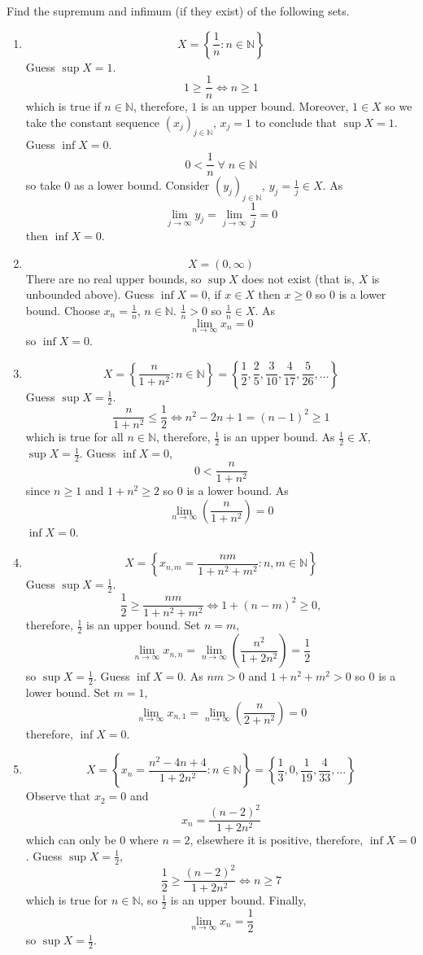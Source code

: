 \begin{example}
    Find the supremum and infimum (if they exist) of the following sets.
    \begin{enumerate}
        \item \[X=\left\{\frac1n:n\in\mathbb N\right\}\]
        Guess $\sup{X}=1$. \[1\geq\frac1n\iff n\geq1\] which is true if $n\in\mathbb N$, therefore, $1$ is an upper bound. Moreover, $1\in X$ so we take the constant sequence $(x_j)_{j\in\mathbb N}$, $x_j=1$ to conclude that $\sup{X}=1$. Guess $\inf{X}=0$. \[0<\frac1n\;\forall\;n\in\mathbb N\] so take $0$ as a lower bound. Consider $(y_j)_{j\in\mathbb N}$, $y_j=\frac1j\in X$. As \[\lim_{j\to\infty}y_j=\lim_{j\to\infty}\frac1j=0\] then $\inf{X}=0$.
        
        \item \[X=(0,\infty)\]
        There are no real upper bounds, so $\sup{X}$ does not exist (that is, $X$ is unbounded above). Guess $\inf{X}=0$, if $x\in X$ then $x\geq 0$ so $0$ is a lower bound. Choose $x_n=\frac1n$, $n\in\mathbb N$. $\frac1n>0$ so $\frac1n\in X$. As \[\lim_{n\to\infty}x_n=0\] so $\inf{X}=0$.
        
        \item \[X=\left\{\dfrac{n}{1+n^2}:n\in\mathbb N\right\}=\left\{\frac12,\frac25,\frac3{10},\frac4{17},\frac5{26},\ldots\right\}\]
        Guess $\sup{X}=\frac12$. \[\dfrac{n}{1+n^2}\leq\frac12\iff n^2-2n+1=(n-1)^2\geq 1\] which is true for all $n\in\mathbb N$, therefore, $\frac12$ is an upper bound. As $\frac12\in X$, $\sup{X}=\frac12$. Guess $\inf{X}=0$, \[0<\dfrac{n}{1+n^2}\] since $n\geq 1$ and $1+n^2\geq2$ so $0$ is a lower bound. As \[\lim_{n\to\infty}\left(\dfrac{n}{1+n^2}\right)=0\] $\inf{X}=0$.
        
        \item \[X=\left\{x_{n,m}=\dfrac{nm}{1+n^2+m^2}:n,m\in\mathbb N\right\}\]
        Guess $\sup{X}=\frac12$. \[\frac12\geq\dfrac{nm}{1+n^2+m^2}\iff1+(n-m)^2\geq 0,\] therefore, $\frac12$ is an upper bound. Set $n=m$, \[\lim_{n\to\infty}x_{n,n}=\lim_{n\to\infty}\left(\dfrac{n^2}{1+2n^2}\right)=\frac12\] so $\sup{X}=\frac12$. Guess $\inf{X}=0$. As $nm>0$ and $1+n^2+m^2>0$ so $0$ is a lower bound. Set $m=1$, \[\lim_{n\to\infty}x_{n,1}=\lim_{n\to\infty}\left(\dfrac{n}{2+n^2}\right)=0\] therefore, $\inf{X}=0$.
        
        \item \[X=\left\{x_n=\dfrac{n^2-4n+4}{1+2n^2}:n\in\mathbb N\right\}=\left\{\frac13,0,\frac1{19},\frac4{33},\ldots\right\}\]
        Observe that $x_2=0$ and \[x_n=\dfrac{(n-2)^2}{1+2n^2}\] which can only be $0$ where $n=2$, elsewhere it is positive, therefore, $\inf{X}=0$. Guess $\sup{X}=\frac12$, \[\frac12\geq\dfrac{(n-2)^2}{1+2n^2}\iff n\geq 7\] which is true for $n\in\mathbb N$, so $\frac12$ is an upper bound. Finally, \[\lim_{n\to\infty}x_n=\frac12\] so $\sup{X}=\frac12$.
    \end{enumerate}
\end{example}

